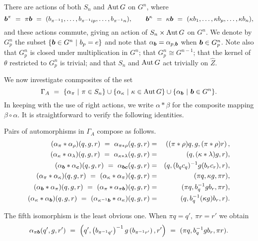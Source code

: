 \medskip\noindent
There are actions of both $S_n$ and $\mathrm{Aut}\,G$ on $G^n$, where
\begin{equation} \label{eq:pi-kappa-actions}
\boldsymbol{b}^{\pi} ~=~ \pi\boldsymbol{b} ~=~ 
(b_{\pi^{-1}1},\ldots,b_{\pi^{-1}ip},\ldots,b_{\pi^{-1}n}), 
\qquad
\boldsymbol{b}^{\kappa} ~=~ \kappa\boldsymbol{b} 
               ~=~ (\kappa b_1,\ldots,\kappa b_p,\ldots,\kappa b_n), 
\end{equation}
and these actions commute, giving an action of $S_n \times \mathrm{Aut}\,G$ on $G^n$. 
We denote by $G^n_p$ the subset $\{\boldsymbol{b} \in G^n ~|~ b_p=e\}$ 
and note that $\alpha_{\boldsymbol{b}} = \alpha_{p,\boldsymbol{b}}$ when $\boldsymbol{b} \in G^n_p$. 
Note also that $G^n_p$ is closed under multiplication in $G^n$; 
that $G^n_p \cong G^{n-1}$; 
that the kernel of $\theta$ restricted to $G^n_p$ is trivial; 
and that $S_n$ and $\mathrm{Aut}\,G$ act trivially on $\hat{Z}$. 
% 

\medskip
We now investigate conmposites of the set 
$$
\Gamma_A ~=~ \{\alpha_{\pi} ~|~ \pi \in S_n\} \cup 
             \{\alpha_{\kappa} ~|~ \kappa \in \mathrm{Aut}\,G\} \cup 
             \{\alpha_{\boldsymbol{b}} ~|~ \boldsymbol{b} \in G^n\}. 
$$
In keeping with the use of right actions, we write $\alpha*\beta$ 
for the composite mapping $\beta\circ\alpha$. 
It is straightforward to verify the following identities. 
\begin{lem} \label{lem:autopairs} 
Pairs of automorphisms in $\Gamma_A$ compose as follows.
\begin{eqnarray*}
(\alpha_{\pi}*\alpha_{\rho})(q,g,r) 
       ~=~  \alpha_{\pi*\rho}(q,g,r) 
  &=& \left( (\pi*\rho)q,g,(\pi*\rho)r \right), \\
(\alpha_{\kappa}*\alpha_{\lambda})(q,g,r) 
       ~=~  \alpha_{\kappa*\lambda}(q,g,r) 
  &=& (q,(\kappa*\lambda)g,r), \\
(\alpha_{\boldsymbol{b}}*\alpha_{\boldsymbol{c}})(q,g,r) 
       ~=~  \alpha_{\boldsymbol{b}\boldsymbol{c}}(q,g,r) 
  &=& (q,(b_qc_q)^{-1}g(b_rc_r),r), \\ 
(\alpha_{\pi}*\alpha{_\kappa})(q,g,r) 
       ~=~  (\alpha_{\kappa}*\alpha_{\pi})(q,g,r) 
  &=& (\pi q, \kappa g, \pi r), \\
(\alpha_{\boldsymbol{b}}*\alpha_{\pi})(q,g,r) 
       ~=~  (\alpha_{\pi}*\alpha_{\pi\boldsymbol{b}})(q,g,r) 
  &=& (\pi q, b_q^{-1}gb_r, \pi r), \\
(\alpha_{\kappa}*\alpha_{\boldsymbol{b}})(q,g,r) 
       ~=~  (\alpha_{\kappa^{-1}\boldsymbol{b}}*\alpha_{\kappa})(q,g,r) 
  &=& (q,b_q^{-1}(\kappa g)b_r,r). 
\end{eqnarray*}
\end{lem}
\begin{pf}
The fifth isomorphism is the least obvious one. 
When $\pi q = q',~ \pi r = r'$ we obtain  
$$
\alpha_{\pi\boldsymbol{b}}(q',g,r') ~=~ 
\left(q',\left(b_{\pi^{-1}q'}\right)^{-1}g\left(b_{\pi^{-1}r'}\right),r'\right)
~=~ (\pi q, b_q^{-1}gb_r,\pi r). 
$$
\end{pf}

